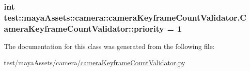 \hypertarget{classtest_1_1mayaAssets_1_1camera_1_1cameraKeyframeCountValidator_1_1CameraKeyframeCountValidator_a0d61dfd554b9b08507c8626e0ca92026}{
\subsubsection[{priority}]{\setlength{\rightskip}{0pt plus 5cm}int {\bf test\-::maya\-Assets\-::camera\-::camera\-Keyframe\-Count\-Validator.\-Camera\-Keyframe\-Count\-Validator\-::priority} = 1}}\label{dc/db7/classtest_1_1mayaAssets_1_1camera_1_1cameraKeyframeCountValidator_1_1CameraKeyframeCountValidator_a0d61dfd554b9b08507c8626e0ca92026}


\-The documentation for this class was generated from the following file\-:\begin{DoxyCompactItemize}
\item 
test/maya\-Assets/camera/\hyperlink{mayaAssets_2camera_2cameraKeyframeCountValidator_8py}{camera\-Keyframe\-Count\-Validator.\-py}\end{DoxyCompactItemize}
